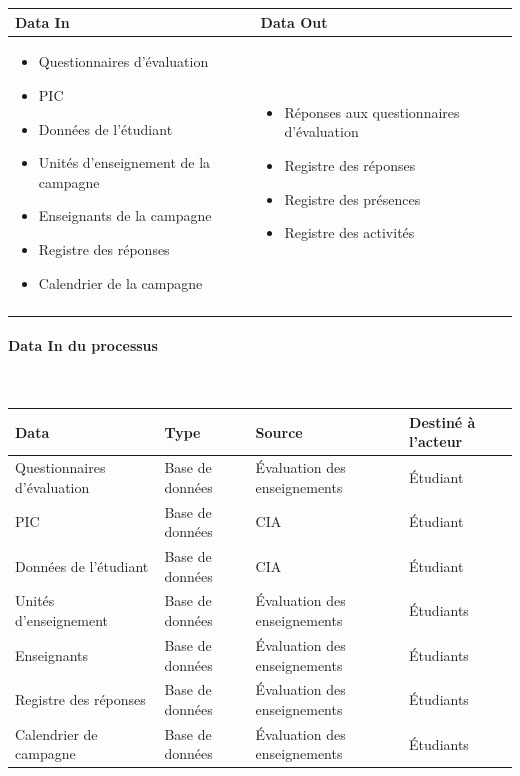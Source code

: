 \documentclass[a4paper,11pt]{report}
\begin{document}
\begin{tabularx}{\linewidth}{|X|X|} \hline
Data In & Data Out \\ \hline
\begin{itemize}
	\item Questionnaires d'évaluation
	\item PIC
	\item Données de l'étudiant
	\item Unités d'enseignement de la campagne
	\item Enseignants de la campagne
	\item Registre des réponses
	\item Calendrier de la campagne
\end{itemize}
&
\begin{itemize}
	\item Réponses aux questionnaires d'évaluation
	\item Registre des réponses
	\item Registre des présences
	\item Registre des activités
\end{itemize}	
\\ 
 & \\ \hline
\end{tabularx}

\paragraph{Data In du processus}~\newline{}

\begin{tabularx}{\linewidth}{|X|X|X|X|} \hline
Data & Type & Source & Destiné à l'acteur \\ \hline
Questionnaires d'évaluation & Base de données & Évaluation des enseignements & Étudiant \\ 
PIC & Base de données & CIA & Étudiant \\
Données de l'étudiant & Base de données & CIA & Étudiant \\
Unités d'enseignement & Base de données & Évaluation des enseignements & Étudiants \\
Enseignants & Base de données & Évaluation des enseignements & Étudiants \\
Registre des réponses & Base de données & Évaluation des enseignements & Étudiants \\
Calendrier de campagne & Base de données & Évaluation des enseignements & Étudiants \\

\hline
\end{tabularx}
\end{document}
